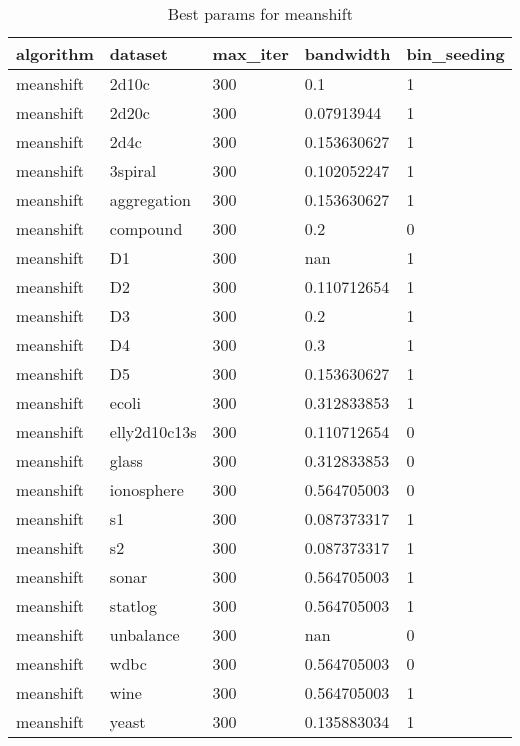 \begin{table}[H]
\centering
\caption{Best params for meanshift}
\label{tab:params:meanshift}
\begin{tabular}{|l|l|l|l|l|}
\hline
algorithm & dataset & max\_iter & bandwidth & bin\_seeding \\
\hline
meanshift & 2d10c & 300 & 0.1 & 1 \\
\hline
meanshift & 2d20c & 300 & 0.07913944 & 1 \\
\hline
meanshift & 2d4c & 300 & 0.153630627 & 1 \\
\hline
meanshift & 3spiral & 300 & 0.102052247 & 1 \\
\hline
meanshift & aggregation & 300 & 0.153630627 & 1 \\
\hline
meanshift & compound & 300 & 0.2 & 0 \\
\hline
meanshift & D1 & 300 & nan & 1 \\
\hline
meanshift & D2 & 300 & 0.110712654 & 1 \\
\hline
meanshift & D3 & 300 & 0.2 & 1 \\
\hline
meanshift & D4 & 300 & 0.3 & 1 \\
\hline
meanshift & D5 & 300 & 0.153630627 & 1 \\
\hline
meanshift & ecoli & 300 & 0.312833853 & 1 \\
\hline
meanshift & elly2d10c13s & 300 & 0.110712654 & 0 \\
\hline
meanshift & glass & 300 & 0.312833853 & 0 \\
\hline
meanshift & ionosphere & 300 & 0.564705003 & 0 \\
\hline
meanshift & s1 & 300 & 0.087373317 & 1 \\
\hline
meanshift & s2 & 300 & 0.087373317 & 1 \\
\hline
meanshift & sonar & 300 & 0.564705003 & 1 \\
\hline
meanshift & statlog & 300 & 0.564705003 & 1 \\
\hline
meanshift & unbalance & 300 & nan & 0 \\
\hline
meanshift & wdbc & 300 & 0.564705003 & 0 \\
\hline
meanshift & wine & 300 & 0.564705003 & 1 \\
\hline
meanshift & yeast & 300 & 0.135883034 & 1 \\
\hline
\end{tabular}
\end{table}
